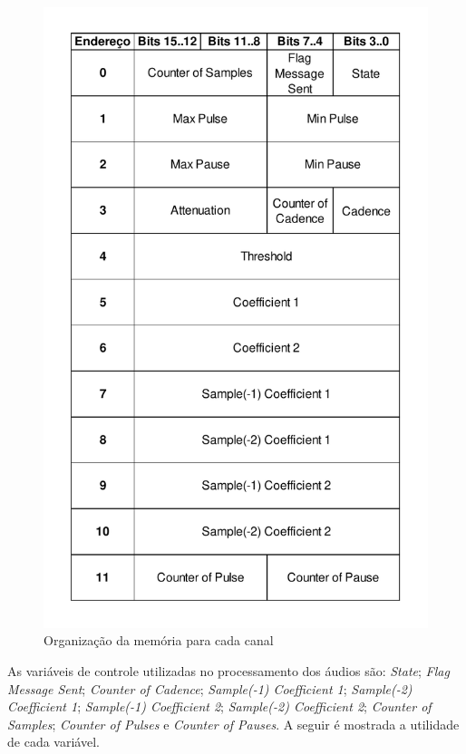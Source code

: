 \documentclass[monografia]{subfiles}
\begin{document}
			\begin{figure}[!h]
			\centering 
			\includegraphics[scale=0.80]{img/memoryStructs/timeSlot.pdf}
			\caption{Organização da memória para cada canal}
			\label{fig:memoryOrganization}
			\end{figure}

		As variáveis de controle utilizadas no processamento dos áudios são: \textit{State}; \textit{Flag Message Sent}; \textit{Counter of Cadence};
		\textit{Sample(-1) Coefficient 1}; \textit{Sample(-2) Coefficient 1}; \textit{Sample(-1) Coefficient 2}; \textit{Sample(-2) Coefficient 2}; 
		\textit{Counter of Samples}; \textit{Counter of Pulses} e \textit{Counter of Pauses}. A seguir é mostrada a utilidade de cada variável.
\end{document}
